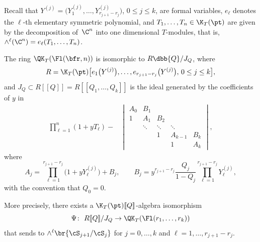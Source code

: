 Recall that $Y^{(j)}=\bigl(Y^{(j)}_1,\dots,
{ Y^{(j)}_{r_{j+1}-r_j}}\bigr)$, $0\leq j\leq k$, are formal variables, $e_\ell$ denotes the $\ell$-th elementary symmetric polynomial, and $T_1,\dots, T_n \in \K_T(\pt)$ are given by
the decomposition of~$\C^n$ into one dimensional $T$-modules, that is, $\wedge^\ell(\C^n)=e_\ell(T_1,\dots,T_n)$.

\begin{Theorem}\label{thm:main}
 The ring $\QK_T(\Fl(\bfr,n))$ is isomorphic to $R\dbb{Q}/J_Q$, where
 \[
 R=\K_T(\pt)\bigl[e_1\bigl(Y^{(j)}\bigr),\dots,e_{r_{j+1}-r_j}\bigl(Y^{(j)}\bigr),\, 0\leq j\leq k\bigr],
 \]
 and $J_Q\subset R[\![Q]\!]=R[\![Q_1,\dots,Q_k]\!]$
is the ideal generated by the coefficients of $y$ in
\begin{align}\label{eqn:whit-short-gen}
 \prod_{\ell=1}^{n}(1+yT_\ell)-
 &\begin{vmatrix}
 A_0 & B_1 & & & \\
 1 & A_1 & B_2 & & \\ & \ddots & \ddots & \ddots & \\ & & 1 & A_{k-1} & B_{k}\\ & & & 1 & A_{k}
 \end{vmatrix},
 \end{align}
 where
 \[
 A_j=\prod_{\ell=1}^{r_{j+1}-r_j}\bigl(1+y Y^{(j)}_\ell\bigr)+B_j,\qquad B_j=y^{{r_{j+1}-r_j}}\frac{Q_j}{1-Q_j}\prod_{\ell=1}^{r_{j+1}-r_j}Y^{(j)}_\ell,
 \]
 with the convention that $Q_0=0$.

 More precisely,
there exists a $\K_T(\pt)[\![Q]\!]$-algebra isomorphism
\[
\Psi\colon\ R[\![Q]\!]/J_Q \to \QK_T(\Fl(r_1,\dots,r_k))
\]
that sends  to $\wedge^\ell\br{\cS_{j+1}/\cS_j}$ for $j=0,\dots,k$ and $\ell=1,\dots,r_{j+1}-r_{j}$.
\end{Theorem}

